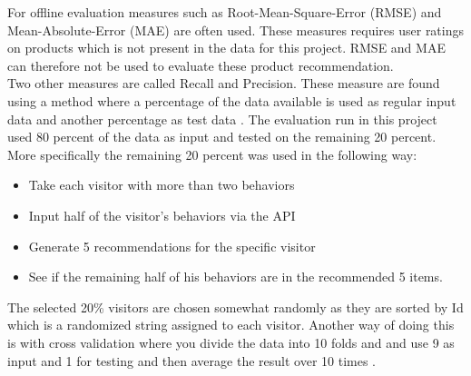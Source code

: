 For offline evaluation measures such as Root-Mean-Square-Error (RMSE) and Mean-Absolute-Error (MAE) \cite{rmseAndmae} are often used. These measures requires user ratings on products which is not present in the data for this project. RMSE and MAE can therefore not be used to evaluate these product recommendation. \\
Two other measures are called Recall and Precision. These measure are found using a method where a percentage of the data available is used as regular input data and another percentage as test data \cite{eval}. The evaluation run in this project used 80 percent of the data as input and tested on the remaining 20 percent. More specifically the remaining 20 percent was used in the following way:
\begin{itemize}
\item Take each visitor with more than two behaviors
\item Input half of the visitor's behaviors via the API
\item Generate 5 recommendations for the specific visitor
\item See if the remaining half of his behaviors are in the recommended 5 items.
\end{itemize}
The selected 20\% visitors are chosen somewhat randomly as they are sorted by Id which is a randomized string assigned to each visitor. Another way of doing this is with cross validation where you divide the data into 10 folds and and use 9 as input and 1 for testing and then average the result over 10 times \cite{eval}.

